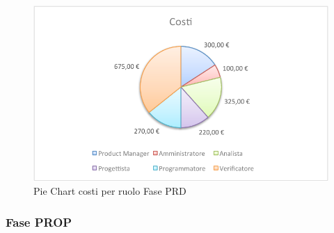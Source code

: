 				\begin{figure}[H]\centering
					\includegraphics[width=\textwidth]{PianoDiProgetto/Pics/ChartTotCostiFasePRD.pdf}
					\caption{Pie Chart costi per ruolo Fase PRD}
				\end{figure}
		\subsubsection{Fase PROP}
